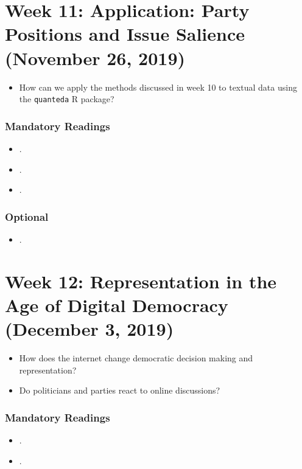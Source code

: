 \documentclass[abstract=on,parskip=full,headings=standardclasses,fontsize=11pt,paper=a4]{scrartcl}
\begin{document}
\section{Week 11:  Application: Party Positions and Issue Salience (November 26, 2019)}

\begin{itemize}
\renewcommand\labelitemi{--}
\item How can we apply the methods discussed in week 10 to textual data using the \texttt{quanteda} \textsf{R} package?
\end{itemize}

\subsubsection*{Mandatory Readings}
\begin{itemize}
\item {}.
\item {}.
\item {}.
\end{itemize}


\subsubsection*{Optional}
\begin{itemize}
\item {}.
\end{itemize}





\section{Week 12: Representation in the Age of Digital Democracy (December 3, 2019)}


\begin{itemize}
\renewcommand\labelitemi{--}
\item How does the internet change democratic decision making and representation?
\item Do politicians and parties react to online discussions?
\end{itemize}

\subsubsection*{Mandatory Readings}
\begin{itemize}
\item {}.
\item {}.
\end{itemize}
\end{document}
